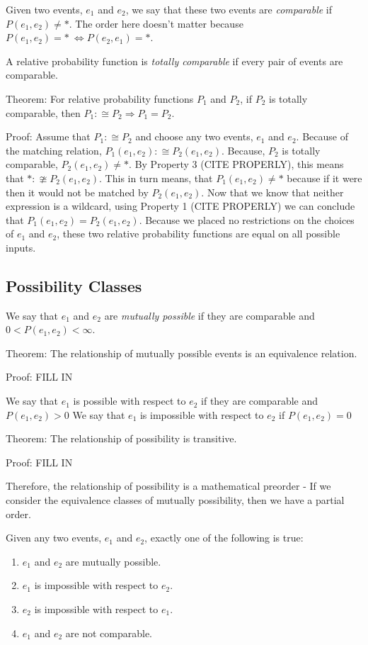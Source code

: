 \documentclass[twoside]{article}
\begin{document}
Given two events, \(e_1\) and \(e_2\), we say that these two events are \textit{comparable} if \(P(e_1, e_2) \neq \ast\). The order here doesn't matter because \(P(e_1, e_2) = \ast\ \Leftrightarrow P(e_2, e_1) = \ast\).

A relative probability function is \textit{totally comparable} if every pair of events are comparable. 

Theorem: For relative probability functions \(P_1\) and \(P_2\), if \(P_2\) is totally comparable, then \(P_1 :\cong P_2 \Rightarrow P_1 = P_2 \).

Proof: Assume that \(P_1 :\cong P_2\) and choose any two events, \(e_1\) and \(e_2\). Because of the matching relation, \(P_1(e_1, e_2) :\cong P_2(e_1, e_2)\). Because, \(P_2\) is totally comparable, \(P_2(e_1, e_2) \neq \ast\). By Property 3 (CITE PROPERLY), this means that \(\ast :\ncong P_2(e_1, e_2)\). This in turn means, that \(P_1(e_1, e_2) \neq \ast\) because if it were then it would not be matched by \(P_2(e_1, e_2)\). Now that we know that neither expression is a wildcard, using Property 1 (CITE PROPERLY) we can conclude that \(P_1(e_1, e_2) = P_2(e_1, e_2)\). Because we placed no restrictions on the choices of \(e_1\) and \(e_2\), these two relative probability functions are equal on all possible inputs.

\subsection{Possibility Classes}

We say that \(e_1\) and \(e_2\) are \textit{mutually possible} if they are comparable and\(0 < P(e_1, e_2) < \infty\).

Theorem: The relationship of mutually possible events is an equivalence relation.

Proof: FILL IN

We say that \(e_1\) is possible with respect to \(e_2\) if they are comparable and \(P(e_1, e_2) > 0\)
We say that \(e_1\) is impossible with respect to \(e_2\) if \(P(e_1, e_2) = 0\)

Theorem: The relationship of possibility is transitive.

Proof: FILL IN

Therefore, the relationship of possibility is a mathematical preorder
- If we consider the equivalence classes of mutually possibility, then we have a partial order.

Given any two events, \(e_1\) and \(e_2\), exactly one of the following is true:
\begin{enumerate}
  \item \(e_1\) and \(e_2\) are mutually possible.
  \item \(e_1\) is impossible with respect to \(e_2\).
  \item \(e_2\) is impossible with respect to \(e_1\).
  \item \(e_1\) and \(e_2\) are not comparable.
\end{enumerate}
\end{document}
